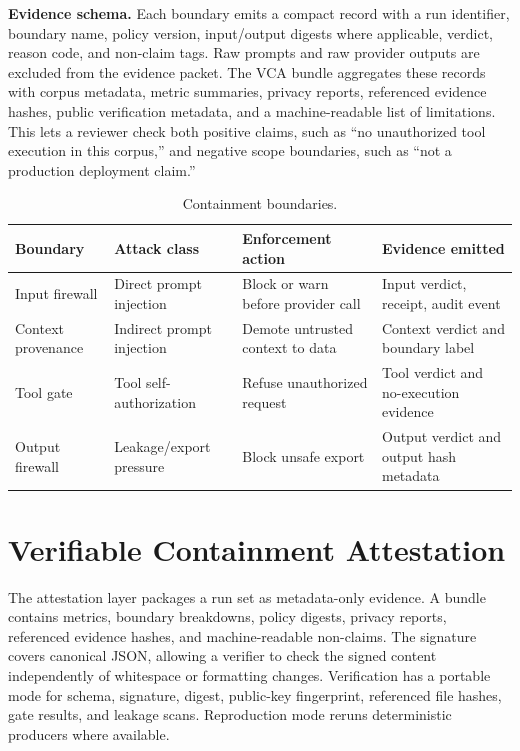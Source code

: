 \documentclass[sigconf,anonymous,review]{acmart}
\begin{document}
\textbf{Evidence schema.} Each boundary emits a compact record with a run identifier, boundary name, policy version, input/output digests where applicable, verdict, reason code, and non-claim tags. Raw prompts and raw provider outputs are excluded from the evidence packet. The VCA bundle aggregates these records with corpus metadata, metric summaries, privacy reports, referenced evidence hashes, public verification metadata, and a machine-readable list of limitations. This lets a reviewer check both positive claims, such as ``no unauthorized tool execution in this corpus,'' and negative scope boundaries, such as ``not a production deployment claim.''

\begin{table}[t]
\caption{Containment boundaries.}
\label{tab:boundaries}
\small
\begin{tabularx}{\textwidth}{p{}p{}p{}X}
\toprule
Boundary & Attack class & Enforcement action & Evidence emitted \\
\midrule
Input firewall & Direct prompt injection & Block or warn before provider call & Input verdict, receipt, audit event \\
Context provenance & Indirect prompt injection & Demote untrusted context to data & Context verdict and boundary label \\
Tool gate & Tool self-authorization & Refuse unauthorized request & Tool verdict and no-execution evidence \\
Output firewall & Leakage/export pressure & Block unsafe export & Output verdict and output hash metadata \\
\bottomrule
\end{tabularx}
\end{table}

\section{Verifiable Containment Attestation}

The attestation layer packages a run set as metadata-only evidence. A bundle contains metrics, boundary breakdowns, policy digests, privacy reports, referenced evidence hashes, and machine-readable non-claims. The signature covers canonical JSON, allowing a verifier to check the signed content independently of whitespace or formatting changes. Verification has a portable mode for schema, signature, digest, public-key fingerprint, referenced file hashes, gate results, and leakage scans. Reproduction mode reruns deterministic producers where available.
\end{document}
